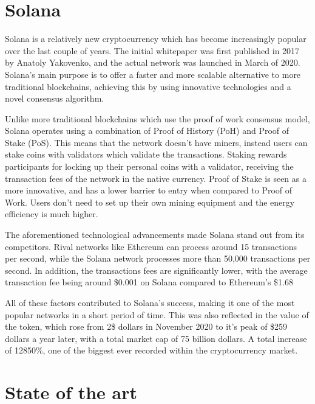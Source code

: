 \section{Solana}\bigbreak

Solana is a relatively new cryptocurrency which has become increasingly popular over the last couple of years. The initial whitepaper was first published in 2017 by Anatoly Yakovenko, and the actual network was launched in March of 2020. Solana’s main purpose is to offer a faster and more scalable alternative to more traditional blockchains, achieving this by using innovative technologies and a novel consensus algorithm. \autocite{Picardo2022} \bigbreak

Unlike more traditional blockchains which use the proof of work consensus model, Solana operates using a combination of Proof of History (PoH) and Proof of Stake (PoS)\autocite{Picardo2022}. This means that the network doesn’t have miners, instead users can stake coins with validators which validate the transactions. Staking rewards participants for locking up their personal coins with a validator, receiving the transaction fees of the network in the native currency. Proof of Stake is seen as a more innovative, and has a lower barrier to entry when compared to Proof of Work. Users don’t need to set up their own mining equipment and the energy efficiency is much higher. \autocite{Frankenfield2023} \bigbreak


The aforementioned technological advancements made Solana stand out from its competitors. Rival networks like Ethereum can process around 15 transactions per second, while the Solana network processes more than 50,000 transactions per second. In addition, the transactions fees are significantly lower, with the average transaction fee being around \$0.001 on Solana compared to Ethereum’s \$1.68 \autocite{Picardo2022} \bigbreak


All of these factors contributed to Solana’s success, making it one of the most popular networks in a short period of time\autocite{Jafar2021}. This was also reflected in the value of the token, which rose from 2\$ dollars in November 2020 to it’s peak of \$259 dollars a year later, with a total market cap of 75 billion dollars. A total increase of 12850\%, one of the biggest ever recorded within the cryptocurrency market. \autocite{Coingecko2023a} \bigbreak


\section{State of the art}\bigbreak

